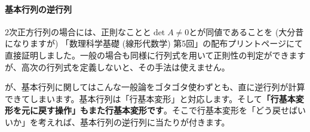 \paragraph{基本行列の逆行列}

$2$次正方行列の場合には、正則なことと$\det A \neq 0$とが同値であることを (大分昔になりますが) 「数理科学基礎 (線形代数学) 第5回」の配布プリント\pageref{paragraph:existence_of_inverse_matrix}ページにて直接証明しました。一般の場合も同様に行列式を用いて正則性の判定ができますが、高次の行列式を定義しないと、その手法は使えません。

が、基本行列に関してはこんな一般論をゴタゴタ使わずとも、直に逆行列が計算できてしまいます。基本行列は「行基本変形」と対応します。そして\textbf{「行基本変形を元に戻す操作」もまた行基本変形です}。そこで行基本変形を「どう戻せばいいか」を考えれば、基本行列の逆行列に当たりが付きます。

